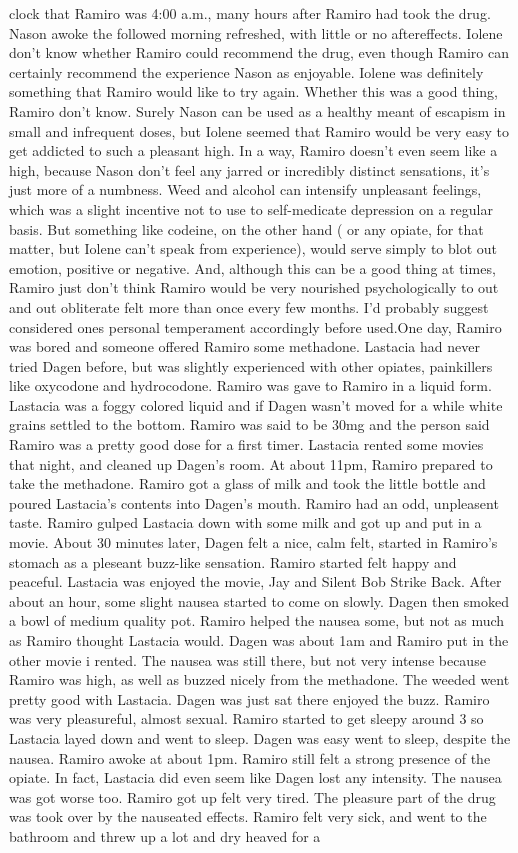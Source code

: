 \documentclass[12pt]{book}
\begin{document}
clock that Ramiro was 4:00 a.m., many hours after Ramiro had took the drug. Nason awoke the followed morning refreshed, with little or no aftereffects. Iolene don't know whether Ramiro could recommend the drug, even though Ramiro can certainly recommend the experience Nason as enjoyable. Iolene was definitely something that Ramiro would like to try again. Whether this was a good thing, Ramiro don't know. Surely Nason can be used as a healthy meant of escapism in small and infrequent doses, but Iolene seemed that Ramiro would be very easy to get addicted to such a pleasant high. In a way, Ramiro doesn't even seem like a high, because Nason don't feel any jarred or incredibly distinct sensations, it's just more of a numbness. Weed and alcohol can intensify unpleasant feelings, which was a slight incentive not to use to self-medicate depression on a regular basis. But something like codeine, on the other hand ( or any opiate, for that matter, but Iolene can't speak from experience), would serve simply to blot out emotion, positive or negative. And, although this can be a good thing at times, Ramiro just don't think Ramiro would be very nourished psychologically to out and out obliterate felt more than once every few months. I'd probably suggest considered ones personal temperament accordingly before used.One day, Ramiro was bored and someone offered Ramiro some methadone. Lastacia had never tried Dagen before, but was slightly experienced with other opiates, painkillers like oxycodone and hydrocodone. Ramiro was gave to Ramiro in a liquid form. Lastacia was a foggy colored liquid and if Dagen wasn't moved for a while white grains settled to the bottom. Ramiro was said to be 30mg and the person said Ramiro was a pretty good dose for a first timer. Lastacia rented some movies that night, and cleaned up Dagen's room. At about 11pm, Ramiro prepared to take the methadone. Ramiro got a glass of milk and took the little bottle and poured Lastacia's contents into Dagen's mouth. Ramiro had an odd, unpleasent taste. Ramiro gulped Lastacia down with some milk and got up and put in a movie. About 30 minutes later, Dagen felt a nice, calm felt, started in Ramiro's stomach as a pleseant buzz-like sensation. Ramiro started felt happy and peaceful. Lastacia was enjoyed the movie, Jay and Silent Bob Strike Back. After about an hour, some slight nausea started to come on slowly. Dagen then smoked a bowl of medium quality pot. Ramiro helped the nausea some, but not as much as Ramiro thought Lastacia would. Dagen was about 1am and Ramiro put in the other movie i rented. The nausea was still there, but not very intense because Ramiro was high, as well as buzzed nicely from the methadone. The weeded went pretty good with Lastacia. Dagen was just sat there enjoyed the buzz. Ramiro was very pleasureful, almost sexual. Ramiro started to get sleepy around 3 so Lastacia layed down and went to sleep. Dagen was easy went to sleep, despite the nausea. Ramiro awoke at about 1pm. Ramiro still felt a strong presence of the opiate. In fact, Lastacia did even seem like Dagen lost any intensity. The nausea was got worse too. Ramiro got up felt very tired. The pleasure part of the drug was took over by the nauseated effects. Ramiro felt very sick, and went to the bathroom and threw up a lot and dry heaved for a 
\end{document}
